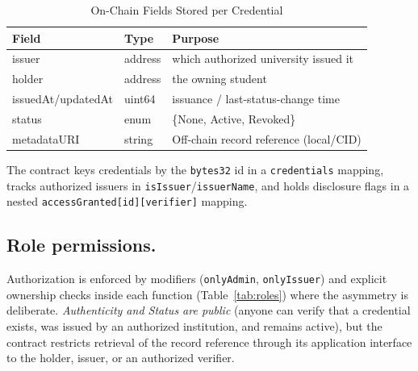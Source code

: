 \documentclass[conference]{IEEEtran}
\begin{document}
\begin{table}[t]
\caption{On-Chain Fields Stored per Credential}
\label{tab:onchain}
\centering
\begin{tabular}{lll}
\hline
\textbf{Field} & \textbf{Type} & \textbf{Purpose}\\
\hline
issuer & address & which authorized university issued it\\
holder & address & the owning student\\
issuedAt/updatedAt & uint64 & issuance / last-status-change time\\
status & enum & \{None, Active, Revoked\}\\
metadataURI & string & Off-chain record reference (local/CID)\\
\hline
\end{tabular}
\end{table}

The contract keys credentials by the \texttt{bytes32} id in a \texttt{credentials} mapping, tracks authorized issuers in \texttt{isIssuer}/\texttt{issuerName}, and holds disclosure flags in a nested \texttt{accessGranted[id][verifier]} mapping.

\subsection{Role permissions.}
Authorization is enforced by modifiers (\texttt{onlyAdmin}, \texttt{onlyIssuer}) and explicit ownership checks inside each function (Table~\ref{tab:roles}) where the asymmetry is deliberate. \emph{Authenticity and Status are public}
(anyone can verify that a credential exists, was issued by an authorized institution, and remains active), but the contract restricts retrieval of the record reference through its application interface to the holder, issuer, or an authorized verifier.
\end{document}
